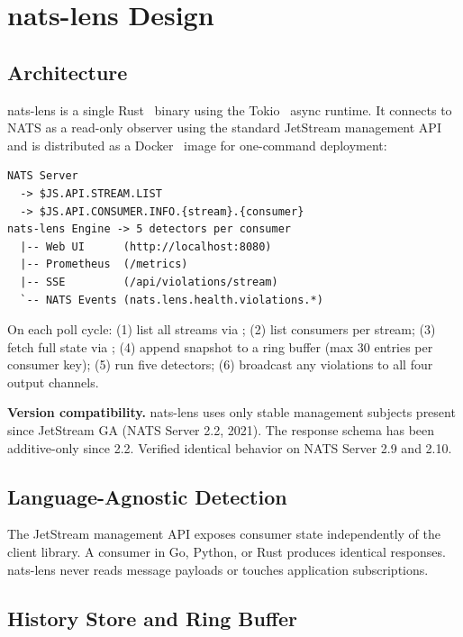 \documentclass[journal]{IEEEtran}
\begin{document}
\section{nats-lens Design}
\label{sec:design}

\subsection{Architecture}

nats-lens is a single Rust~\cite{rust} binary using the Tokio~\cite{tokio}
async runtime. It connects to NATS as a read-only observer using the
standard JetStream management API and is distributed as a Docker~\cite{docker}
image for one-command deployment:

\begin{lstlisting}
NATS Server
  -> $JS.API.STREAM.LIST
  -> $JS.API.CONSUMER.INFO.{stream}.{consumer}
nats-lens Engine -> 5 detectors per consumer
  |-- Web UI      (http://localhost:8080)
  |-- Prometheus  (/metrics)
  |-- SSE         (/api/violations/stream)
  `-- NATS Events (nats.lens.health.violations.*)
\end{lstlisting}

On each poll cycle: (1) list all streams via ;
(2) list consumers per stream; (3) fetch full state via
; (4) append snapshot to a ring buffer
(max 30 entries per consumer key); (5) run five detectors;
(6) broadcast any violations to all four output channels.

\textbf{Version compatibility.} nats-lens uses only stable
 management subjects present since JetStream GA
(NATS Server 2.2, 2021). The  response schema has
been additive-only since 2.2. Verified identical behavior on NATS
Server 2.9 and 2.10.

\subsection{Language-Agnostic Detection}

The JetStream management API exposes consumer state independently of
the client library. A consumer in Go, Python, or Rust produces identical
 responses. nats-lens never reads message
payloads or touches application subscriptions.

\subsection{History Store and Ring Buffer}
\end{document}

